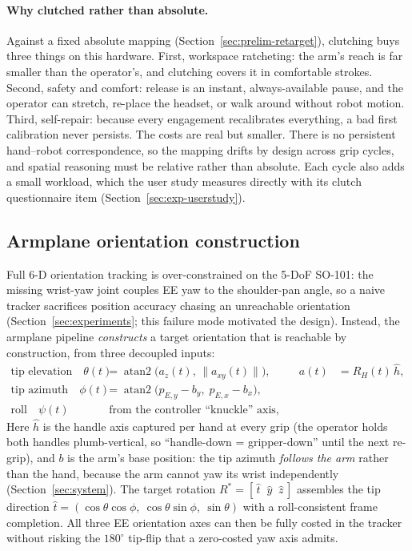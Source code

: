 \paragraph{Why clutched rather than absolute.}
Against a fixed absolute mapping (Section~\ref{sec:prelim-retarget}),
clutching buys three things on this hardware. First, workspace
ratcheting: the arm's reach is far smaller than the operator's, and
clutching covers it in comfortable strokes. Second, safety and comfort:
release is an instant, always-available pause, and the operator can
stretch, re-place the headset, or walk around without robot motion.
Third, self-repair: because every engagement recalibrates everything, a
bad first calibration never persists. The costs are real but smaller.
There is no persistent hand--robot correspondence, so the mapping drifts
by design across grip cycles, and spatial reasoning must be relative
rather than absolute. Each cycle also adds a small workload, which the
user study measures directly with its clutch questionnaire item
(Section~\ref{sec:exp-userstudy}).

\subsection{Armplane orientation construction}
\label{sec:armplane}

Full 6-D orientation tracking is over-constrained on the 5-DoF SO-101:
the missing wrist-yaw joint couples EE yaw to the shoulder-pan angle, so
a naive tracker sacrifices position accuracy chasing an unreachable
orientation (Section~\ref{sec:experiments}; this failure mode motivated
the design). Instead, the armplane pipeline \emph{constructs} a target
orientation that is reachable by construction, from three decoupled
inputs:
\begin{align}
  \text{tip elevation} \quad
  \theta(t) &= \operatorname{atan2}\!\bigl(a_z(t),\,\lVert a_{xy}(t)\rVert\bigr),
  & a(t) &= R_H(t)\,\hat h,
  \label{eq:elev}\\
  \text{tip azimuth} \quad
  \phi(t) &= \operatorname{atan2}\!\bigl(p_{E,y}-b_y,\;p_{E,x}-b_x\bigr),
  \label{eq:azim}\\
  \text{roll} \quad
  \psi(t) &\;\text{from the controller ``knuckle'' axis, orthogonalised
  against the tip.}
  \label{eq:roll}
\end{align}
Here \(\hat h\) is the handle axis captured per hand at every grip (the
operator holds both handles plumb-vertical, so ``handle-down =
gripper-down'' until the next re-grip), and \(b\) is the arm's base
position: the tip azimuth \emph{follows the arm} rather than the hand,
because the arm cannot yaw its wrist independently
(Section~\ref{sec:system}). The target rotation
\(R^\ast = [\,\hat t \;\; \hat y \;\; \hat z\,]\) assembles the tip
direction \(\hat t = (\cos\theta\cos\phi,\ \cos\theta\sin\phi,\
\sin\theta)\) with a roll-consistent frame completion. All three EE
orientation axes can then be fully costed in the tracker without risking
the \(180^\circ\) tip-flip that a zero-costed yaw axis admits.


